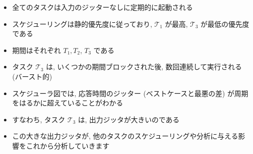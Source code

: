 \begin{frame}{}
\end{frame}

\begin{frame}{}
    \begin{itemize}
        \item 全てのタスクは入力のジッターなしに定期的に起動される
        \item スケジューリングは静的優先度に従っており, $\mathcal{T}_{1}$ が最高, $\mathcal{T}_{3}$ が最低の優先度である
        \item 期間はそれぞれ $T_{1}, T_{2}$, $T_{3}$ である
        \item タスク $\mathcal{T}_{3}$ は, いくつかの期間ブロックされた後, 数回連続して実行される (バースト的)
        \item スケジューラ図では, 応答時間のジッター (ベストケースと最悪の差) が周期をはるかに超えていることがわかる
        \item すなわち, タスク $\mathcal{T}_{3}$ は, 出力ジッタが大きいのである
        \item この大きな出力ジッタが, 他のタスクのスケジューリングや分析に与える影響をこれから分析していきます
    \end{itemize}
\end{frame}

\begin{frame}{}
\end{frame}

